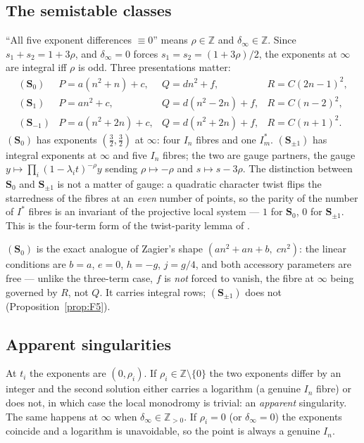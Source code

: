 \documentclass[11pt,reqno]{amsart}
\theoremstyle{plain}
\theoremstyle{definition}
\theoremstyle{remark}
\theoremstyle{plain}
\newcommand{\Z}{\mathbb{Z}}
\begin{document}
\subsection{The semistable classes}
``All five exponent differences $\equiv0$'' means $\rho\in\Z$ and
$\delta_\infty\in\Z$. Since $s_1+s_2=1+3\rho$, and $\delta_\infty=0$ forces
$s_1=s_2=(1+3\rho)/2$, the exponents at $\infty$ are integral iff $\rho$ is odd.
Three presentations matter:
\[
\begin{array}{llll}
(\mathbf S_0)&P=a(n^2+n)+c,&Q=dn^2+f,&R=C(2n-1)^2,\\
(\mathbf S_1)&P=an^2+c,&Q=d(n^2-2n)+f,&R=C(n-2)^2,\\
(\mathbf S_{-1})&P=a(n^2+2n)+c,&Q=d(n^2+2n)+f,&R=C(n+1)^2 .
\end{array}
\]
$(\mathbf S_0)$ has exponents $(\tfrac32,\tfrac32)$ at $\infty$: four $I_n$
fibres and one $I_m^*$. $(\mathbf S_{\pm1})$ has integral exponents at $\infty$
and five $I_n$ fibres; the two are gauge partners, the gauge
$y\mapsto\prod_i(1-\lambda_it)^{-\rho}y$ sending $\rho\mapsto-\rho$ and
$s\mapsto s-3\rho$. The distinction between $\mathbf S_0$ and $\mathbf S_{\pm1}$
is not a matter of gauge: a quadratic character twist flips the starredness of
the fibres at an \emph{even} number of points, so the parity of the number of
$I^*$ fibres is an invariant of the projective local system --- $1$ for
$\mathbf S_0$, $0$ for $\mathbf S_{\pm1}$. This is the four-term form of the
twist-parity lemma of \cite{CLASS}.

$(\mathbf S_0)$ is the exact analogue of Zagier's shape $(an^2+an+b,\;cn^2)$:
the linear conditions are $b=a$, $e=0$, $h=-g$, $j=g/4$, and both accessory
parameters are free --- unlike the three-term case, $f$ is \emph{not} forced to
vanish, the fibre at $\infty$ being governed by $R$, not $Q$. It carries integral
rows; $(\mathbf S_{\pm1})$ does not (Proposition~\ref{prop:F5}).

\subsection{Apparent singularities}\label{sec:apparent}
At $t_i$ the exponents are $(0,\rho_i)$. If $\rho_i\in\Z\setminus\{0\}$ the two
exponents differ by an integer and the second solution either carries a logarithm
(a genuine $I_n$ fibre) or does not, in which case the local monodromy is
trivial: an \emph{apparent} singularity. The same happens at $\infty$ when
$\delta_\infty\in\Z_{>0}$. If $\rho_i=0$ (or $\delta_\infty=0$) the exponents
coincide and a logarithm is unavoidable, so the point is always a genuine $I_n$.
\end{document}
